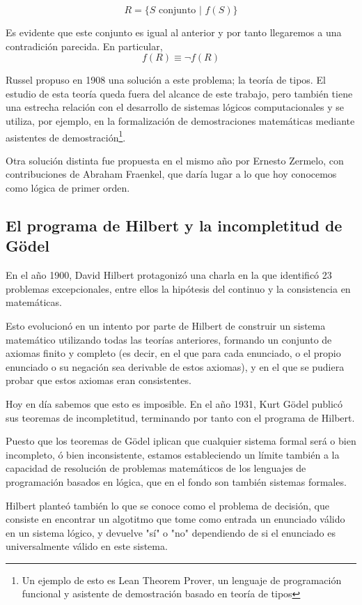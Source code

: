 \documentclass{article}
\begin{document}
$$
    R = \{S \,\, \text{conjunto} \,\, | \,\, f(S)\}
$$

Es evidente que este conjunto es igual al anterior y por tanto llegaremos a una contradición parecida. En particular, $$f(R) \equiv \lnot f(R)$$

Russel propuso en 1908 una solución a este problema; la teoría de tipos. El estudio de esta teoría queda fuera del alcance de este trabajo, pero también tiene una estrecha relación con el desarrollo de sistemas lógicos computacionales y se utiliza, por ejemplo, en la formalización de demostraciones matemáticas mediante asistentes de demostración\footnote{Un ejemplo de esto es Lean Theorem Prover, un lenguaje de programación funcional y asistente de demostración basado en teoría de tipos}.

Otra solución distinta fue propuesta en el mismo año por Ernesto Zermelo, con contribuciones de Abraham Fraenkel, que daría lugar a lo que hoy conocemos como lógica de primer orden.

\subsection{El programa de Hilbert y la incompletitud de Gödel}

En el año 1900, David Hilbert protagonizó una charla en la que identificó 23 problemas excepcionales, entre ellos la hipótesis del continuo y la consistencia en matemáticas.

Esto evolucionó en un intento por parte de Hilbert de construir un sistema matemático utilizando todas las teorías anteriores, formando un conjunto de axiomas finito y completo (es decir, en el que para cada enunciado, o el propio enunciado o su negación sea derivable de estos axiomas), y en el que se pudiera probar que estos axiomas eran consistentes.

Hoy en día sabemos que esto es imposible. En el año 1931, Kurt Gödel publicó sus teoremas de incompletitud, terminando por tanto con el programa de Hilbert\cite{blackburn2005oxford}.

Puesto que los teoremas de Gödel iplican que cualquier sistema formal será o bien incompleto, ó bien inconsistente, estamos estableciendo un límite también a la capacidad de resolución de problemas matemáticos de los lenguajes de programación basados en lógica, que en el fondo son también sistemas formales.

Hilbert planteó también lo que se conoce como el problema de decisión, que consiste en encontrar un algotitmo que tome como entrada un enunciado válido en un sistema lógico, y devuelve "sí" o "no" dependiendo de si el enunciado es universalmente válido en este sistema\cite{blackburn2005oxford}.
\end{document}
